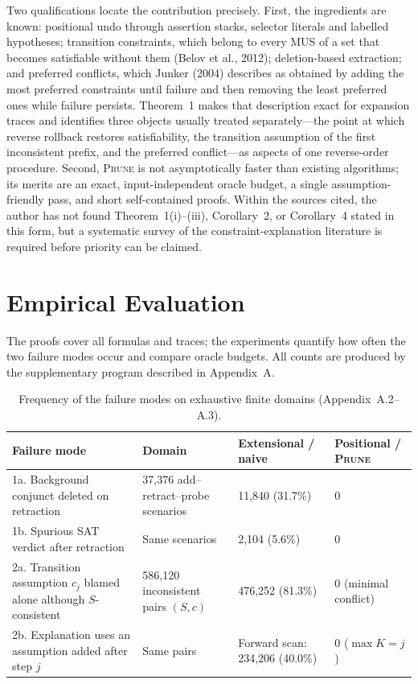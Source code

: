 \documentclass[11pt,reqno]{amsart}
\theoremstyle{plain}
\theoremstyle{definition}
\newcommand{\PRUNE}{\textsc{Prune}}
\begin{document}
Two qualifications locate the contribution precisely. First, the ingredients are
known: positional undo through assertion stacks, selector literals and labelled
hypotheses; transition constraints, which belong to every MUS of a set that becomes
satisfiable without them (Belov et al., 2012); deletion-based extraction; and
preferred conflicts, which Junker (2004) describes as obtained by adding the most
preferred constraints until failure and then removing the least preferred ones
while failure persists. Theorem~1 makes that description exact for expansion traces
and identifies three objects usually treated separately---the point at which
reverse rollback restores satisfiability, the transition assumption of the first
inconsistent prefix, and the preferred conflict---as aspects of one reverse-order
procedure. Second, \PRUNE{} is not asymptotically faster than existing algorithms;
its merits are an exact, input-independent oracle budget, a single
assumption-friendly pass, and short self-contained proofs. Within the sources
cited, the author has not found Theorem~1(i)--(iii), Corollary~2, or Corollary~4
stated in this form, but a systematic survey of the constraint-explanation
literature is required before priority can be claimed.

\section{Empirical Evaluation}
The proofs cover all formulas and traces; the experiments quantify how often the
two failure modes occur and compare oracle budgets. All counts are produced by the
supplementary program described in Appendix~A.

\begin{table}[t]
\centering
\caption{Frequency of the failure modes on exhaustive finite domains
(Appendix~A.2--A.3).}
\small
\begin{tabular}{@{}p{4.3cm}p{3.1cm}p{2.6cm}p{2.3cm}@{}}
\toprule
\textbf{Failure mode} & \textbf{Domain} & \textbf{Extensional / naive} & \textbf{Positional / \PRUNE}\\
\midrule
1a. Background conjunct deleted on retraction & 37{,}376 add--retract--probe scenarios & 11{,}840 (31.7\%) & 0\\
1b. Spurious SAT verdict after retraction & Same scenarios & 2{,}104 (5.6\%) & 0\\
2a. Transition assumption $c_j$ blamed alone although $S$-consistent & 586{,}120 inconsistent pairs $(S,c)$ & 476{,}252 (81.3\%) & 0 (minimal conflict)\\
2b. Explanation uses an assumption added after step $j$ & Same pairs & Forward scan: 234{,}206 (40.0\%) & 0 ($\max K=j$)\\
\bottomrule
\end{tabular}
\end{table}
\end{document}
